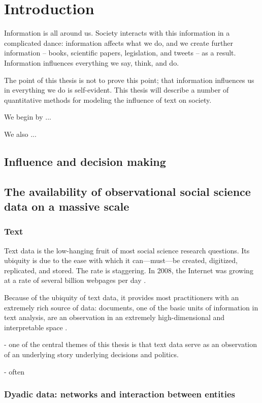 \chapter{Introduction}


Information is all around us.  Society interacts with this information
in a complicated dance: information affects what we do, and we create
further information -- books, scientific papers, legislation, and
tweets -- as a result.  Information influences everything we say,
think, and do.

The point of this thesis is not to prove this point; that information
influences us in everything we do is self-evident.  This thesis will
describe a number of quantitative methods for modeling the influence of text on society.

We begin by ...

We also ...

\section{Influence and decision making}

\section{The availability of observational social science data on a massive scale}

\subsection{Text}
Text data is the low-hanging fruit of most social science research
questions.  Its ubiquity is due to the ease with which it
can---must---be created, digitized, replicated, and stored.  The rate
is staggering.  In 2008, the Internet was growing at a rate of several
billion webpages per day \cite{googleblog:2008}.

Because of the ubiquity of text data, it provides most practitioners
with an extremely rich source of data: documents, one of the basic
units of information in text analysis, are an observation in an
extremely high-dimensional and interpretable space
\cite{changrtl:2009}.

- one of the central themes of this thesis is that text data serve as an observation of an underlying story underlying decisions and politics.

- often

\subsection{Dyadic data: networks and interaction between entities}

